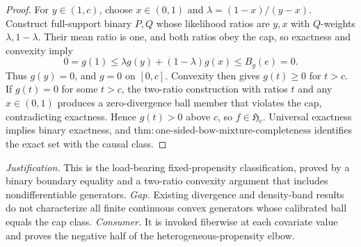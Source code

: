 \documentclass{article}
\begin{document}
\begin{proof}
For \(y\in(1,c)\), choose \(x\in(0,1)\) and \(\lambda=(1-x)/(y-x)\).  Construct full-support binary \(P,Q\) whose likelihood ratios are \(y,x\) with \(Q\)-weights \(\lambda,1-\lambda\).  Their mean ratio is one, and both ratios obey the cap, so exactness and convexity imply
\[
 0=g(1)\le\lambda g(y)+(1-\lambda)g(x)\le B_g(e)=0.
\]
Thus \(g(y)=0\), and \(g=0\) on \([0,c]\).  Convexity then gives \(g(t)\ge0\) for \(t>c\).  If \(g(t)=0\) for some \(t>c\), the two-ratio construction with ratios \(t\) and any \(x\in(0,1)\) produces a zero-divergence ball member that violates the cap, contradicting exactness.  Hence \(g(t)>0\) above \(c\), so \(f\in\mathfrak H_c\).  Universal exactness implies binary exactness, and \(\mathrm{thm:one\text{-}sided\text{-}bow\text{-}mixture\text{-}completeness}\) identifies the exact set with the causal class.
\end{proof}
\par\smallskip\noindent \textit{Justification.} This is the load-bearing fixed-propensity classification, proved by a binary boundary equality and a two-ratio convexity argument that includes nondifferentiable generators. \textit{Gap.} Existing divergence and density-band results do not characterize all finite continuous convex generators whose calibrated ball equals the cap class. \textit{Consumer.} It is invoked fiberwise at each covariate value and proves the negative half of the heterogeneous-propensity elbow.
\end{document}
